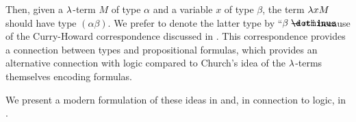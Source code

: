 Then, given a \( \mathrm{\lambda} \)-term \( M \) of type \( \alpha \) and a variable \( x \) of type \( \beta \), the term \( \mathrm{\lambda} x M \) should have type \( (\alpha\beta) \). We prefer to denote the latter type by \enquote{\( \beta \synimplies \alpha \)} because of the Curry-Howard correspondence discussed in . This correspondence provides a connection between types and propositional formulas, which provides an alternative connection with logic compared to Church's idea of the \( \mathrm{\lambda} \)-terms themselves encoding formulas.

We present a modern formulation of these ideas in  and, in connection to logic, in .
